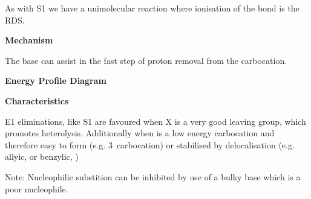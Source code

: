 As with S1 we have a unimolecular reaction where ionisation of the 
bond is the RDS.

\textbf{Mechanism}


The base can assist in the fast step of proton removal from the carbocation.

\textbf{Energy Profile Diagram}


\textbf{Characteristics}

E1 eliminations, like S1 are favoured when X is a very good leaving group,
which promotes heterolysis. Additionally when  is a low energy carbocation
and therefore easy to form (e.g. 3\de\ carbocation) or stabilised by
delocalisation (e.g. allyic,  or benzylic, )

Note: Nucleophilic substition can be inhibited by use of a bulky base which is a
poor nucleophile.

